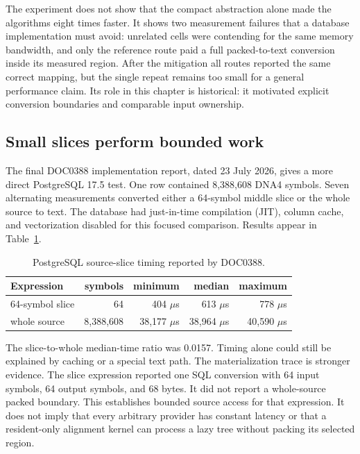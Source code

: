 The experiment does not show that the compact abstraction alone made the
algorithms eight times faster.  It shows two measurement failures that a
database implementation must avoid: unrelated cells were contending for the
same memory bandwidth, and only the reference route paid a full packed-to-text
conversion inside its measured region.  After the mitigation all routes
reported the same correct mapping, but the single repeat remains too small for
a general performance claim.  Its role in this chapter is historical: it
motivated explicit conversion boundaries and comparable input ownership.

\subsection{Small slices perform bounded work}

The final DOC0388 implementation report, dated 23 July 2026, gives a more
direct PostgreSQL 17.5 test.  One row contained 8,388,608 DNA4 symbols.  Seven
alternating measurements converted either a 64-symbol middle slice or the whole
source to text.  The database had just-in-time compilation (JIT), column cache,
and vectorization disabled for this focused comparison.  Results appear in
Table~\ref{tab:slice-bounded-work}.

\begin{table}[ht]
\centering
\caption{PostgreSQL source-slice timing reported by DOC0388.}
\label{tab:slice-bounded-work}
\begin{tabular}{lrrrr}
\textbf{Expression} & \textbf{symbols} & \textbf{minimum} &
\textbf{median} & \textbf{maximum}\\
\hline
64-symbol slice & 64 & 404 \(\mu\)s & 613 \(\mu\)s & 778 \(\mu\)s\\
whole source & 8,388,608 & 38,177 \(\mu\)s & 38,964 \(\mu\)s &
40,590 \(\mu\)s\\
\end{tabular}
\end{table}

The slice-to-whole median-time ratio was 0.0157.  Timing alone could still be
explained by caching or a special text path.  The materialization trace is
stronger evidence.  The slice expression reported one SQL conversion with 64
input symbols, 64 output symbols, and 68 bytes.  It did not report a
whole-source packed boundary.  This establishes bounded source access for that
expression.  It does not imply that every arbitrary provider has constant
latency or that a resident-only alignment kernel can process a lazy tree
without packing its selected region.

